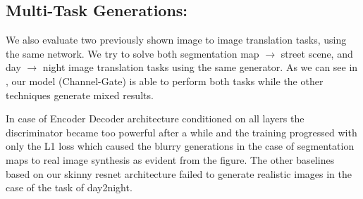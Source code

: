 \subsection{Multi-Task Generations: }
We also evaluate two previously shown image to image translation tasks, using the same network. 
We try to solve both segmentation map $\rightarrow$ street scene, and day $\rightarrow$ night image translation tasks using the same generator. 
As we can see in , our model (Channel-Gate) is able to perform both tasks while the other techniques generate mixed results. 

In case of Encoder Decoder architecture \cite{huang2018multimodal} conditioned on all layers the discriminator became too powerful after a while and the training progressed with only the L1 loss which caused the blurry generations in the case of segmentation maps to real image synthesis as evident from the figure. The other baselines based on our skinny resnet architecture failed to generate realistic images in the case of the task of day2night.







